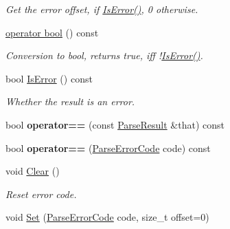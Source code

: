 \begin{DoxyCompactItemize}
\begin{DoxyCompactList}\small\item\em Get the error offset, if \hyperlink{struct_parse_result_a07c35a6769f5cb8a73cbc56c41e60a2a}{Is\+Error()}, 0 otherwise. \end{DoxyCompactList}\item 
\hyperlink{struct_parse_result_a74ab79dfa41d390002d1ea188a749bce}{operator bool} () const \hypertarget{struct_parse_result_a74ab79dfa41d390002d1ea188a749bce}{}\label{struct_parse_result_a74ab79dfa41d390002d1ea188a749bce}

\begin{DoxyCompactList}\small\item\em Conversion to {\ttfamily bool}, returns {\ttfamily true}, iff !\hyperlink{struct_parse_result_a07c35a6769f5cb8a73cbc56c41e60a2a}{Is\+Error()}. \end{DoxyCompactList}\item 
bool \hyperlink{struct_parse_result_a07c35a6769f5cb8a73cbc56c41e60a2a}{Is\+Error} () const \hypertarget{struct_parse_result_a07c35a6769f5cb8a73cbc56c41e60a2a}{}\label{struct_parse_result_a07c35a6769f5cb8a73cbc56c41e60a2a}

\begin{DoxyCompactList}\small\item\em Whether the result is an error. \end{DoxyCompactList}\item 
bool {\bfseries operator==} (const \hyperlink{struct_parse_result}{Parse\+Result} \&that) const \hypertarget{struct_parse_result_a90794619408c295ffa923f3307526bed}{}\label{struct_parse_result_a90794619408c295ffa923f3307526bed}

\item 
bool {\bfseries operator==} (\hyperlink{group___r_a_p_i_d_j_s_o_n___e_r_r_o_r_s_ga8d4b32dfc45840bca189ade2bbcb6ba7}{Parse\+Error\+Code} code) const \hypertarget{struct_parse_result_a5a0bd70f5bbb383ac63a6450ac4ae4d1}{}\label{struct_parse_result_a5a0bd70f5bbb383ac63a6450ac4ae4d1}

\item 
void \hyperlink{struct_parse_result_a88b6d44f052a19e6436ae6aadc2c40b4}{Clear} ()\hypertarget{struct_parse_result_a88b6d44f052a19e6436ae6aadc2c40b4}{}\label{struct_parse_result_a88b6d44f052a19e6436ae6aadc2c40b4}

\begin{DoxyCompactList}\small\item\em Reset error code. \end{DoxyCompactList}\item 
void \hyperlink{struct_parse_result_aa81b4a7b776b77216cb752385203a8c1}{Set} (\hyperlink{group___r_a_p_i_d_j_s_o_n___e_r_r_o_r_s_ga8d4b32dfc45840bca189ade2bbcb6ba7}{Parse\+Error\+Code} code, size\+\_\+t offset=0)\hypertarget{struct_parse_result_aa81b4a7b776b77216cb752385203a8c1}{}\label{struct_parse_result_aa81b4a7b776b77216cb752385203a8c1}


\end{DoxyCompactItemize}

